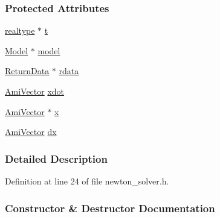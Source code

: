 \subsubsection*{Protected Attributes}
\begin{DoxyCompactItemize}
\item 
\mbox{\hyperlink{namespaceamici_a1bdce28051d6a53868f7ccbf5f2c14a3}{realtype}} $\ast$ \mbox{\hyperlink{classamici_1_1_newton_solver_ad94d61da9b85c1a151ffd8e228758c7c}{t}}
\item 
\mbox{\hyperlink{classamici_1_1_model}{Model}} $\ast$ \mbox{\hyperlink{classamici_1_1_newton_solver_a7b56c3ca57dde73bdbc8dbe9772bca19}{model}}
\item 
\mbox{\hyperlink{classamici_1_1_return_data}{Return\+Data}} $\ast$ \mbox{\hyperlink{classamici_1_1_newton_solver_a4c0807651f0594a186e8856f22e442cc}{rdata}}
\item 
\mbox{\hyperlink{classamici_1_1_ami_vector}{Ami\+Vector}} \mbox{\hyperlink{classamici_1_1_newton_solver_a6329150d913cecfe54dad5fd03214ce8}{xdot}}
\item 
\mbox{\hyperlink{classamici_1_1_ami_vector}{Ami\+Vector}} $\ast$ \mbox{\hyperlink{classamici_1_1_newton_solver_af64268982dd7b9be1690573763982e0b}{x}}
\item 
\mbox{\hyperlink{classamici_1_1_ami_vector}{Ami\+Vector}} \mbox{\hyperlink{classamici_1_1_newton_solver_a17e4770df418fc1f2c4283d7e188d81d}{dx}}
\end{DoxyCompactItemize}


\subsubsection{Detailed Description}


Definition at line 24 of file newton\+\_\+solver.\+h.



\subsubsection{Constructor \& Destructor Documentation}
\mbox{\label{classamici_1_1_newton_solver_ab8ae759b768fe202522ca33df2770be0}} 

